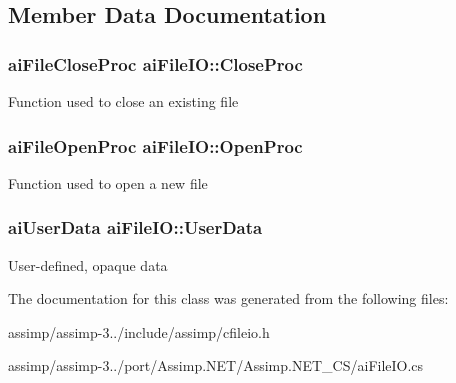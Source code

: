 \subsection{Member Data Documentation}
\hypertarget{structai_file_i_o_a7ec702672712b5a02dc49cb17f980a14}{
\subsubsection[{Close\+Proc}]{\setlength{\rightskip}{0pt plus 5cm}ai\+File\+Close\+Proc ai\+File\+I\+O\+::\+Close\+Proc}}\label{structai_file_i_o_a7ec702672712b5a02dc49cb17f980a14}
Function used to close an existing file \hypertarget{structai_file_i_o_a819d9c7823039294125068d06949a6df}{
\subsubsection[{Open\+Proc}]{\setlength{\rightskip}{0pt plus 5cm}ai\+File\+Open\+Proc ai\+File\+I\+O\+::\+Open\+Proc}}\label{structai_file_i_o_a819d9c7823039294125068d06949a6df}
Function used to open a new file \hypertarget{structai_file_i_o_a9c62b7f3d70fbb2f41e33ad0b9933139}{
\subsubsection[{User\+Data}]{\setlength{\rightskip}{0pt plus 5cm}ai\+User\+Data ai\+File\+I\+O\+::\+User\+Data}}\label{structai_file_i_o_a9c62b7f3d70fbb2f41e33ad0b9933139}
User-\/defined, opaque data 

The documentation for this class was generated from the following files\+:\begin{DoxyCompactItemize}
\item 
assimp/assimp-\/3../include/assimp/cfileio.\+h\item 
assimp/assimp-\/3../port/\+Assimp.\+N\+E\+T/\+Assimp.\+N\+E\+T\+\_\+\+C\+S/ai\+File\+I\+O.\+cs\end{DoxyCompactItemize}
